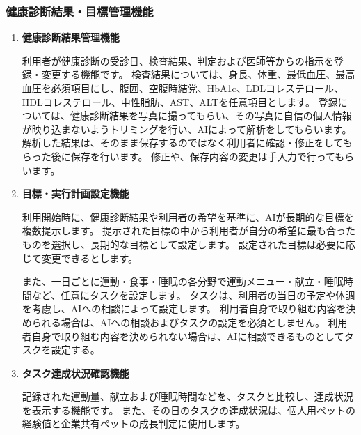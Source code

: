 \documentclass[uplatex,dvipdfmx]{jlreq}
\begin{document}
\subsubsection{健康診断結果・目標管理機能}
\begin{enumerate}
\item \textbf{健康診断結果管理機能}

利用者が健康診断の受診日、検査結果、判定および医師等からの指示を登録・変更する機能です。
検査結果については、身長、体重、最低血圧、最高血圧を必須項目にし、腹囲、空腹時結党、HbA1c、LDLコレステロール、HDLコレステロール、中性脂肪、AST、ALTを任意項目とします。
登録については、健康診断結果を写真に撮ってもらい、その写真に自信の個人情報が映り込まないようトリミングを行い、AIによって解析をしてもらいます。
解析した結果は、そのまま保存するのではなく利用者に確認・修正をしてもらった後に保存を行います。
修正や、保存内容の変更は手入力で行ってもらいます。

\item \textbf{目標・実行計画設定機能}

利用開始時に、健康診断結果や利用者の希望を基準に、AIが長期的な目標を複数提示します。
提示された目標の中から利用者が自分の希望に最も合ったものを選択し、長期的な目標として設定します。
設定された目標は必要に応じて変更できるとします。

また、一日ごとに運動・食事・睡眠の各分野で運動メニュー・献立・睡眠時間など、任意にタスクを設定します。
タスクは、利用者の当日の予定や体調を考慮し、AIへの相談によって設定します。
利用者自身で取り組む内容を決められる場合は、AIへの相談およびタスクの設定を必須としません。
利用者自身で取り組む内容を決められない場合は、AIに相談できるものとしてタスクを設定する。


\item \textbf{タスク達成状況確認機能}

記録された運動量、献立および睡眠時間などを、タスクと比較し、達成状況を表示する機能です。
また、その日のタスクの達成状況は、個人用ペットの経験値と企業共有ペットの成長判定に使用します。
\end{enumerate}
\end{document}
